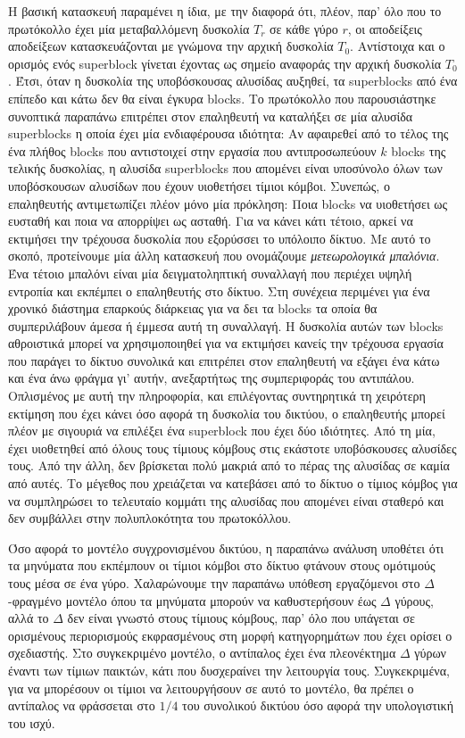 Η βασική κατασκευή παραμένει η ίδια, με την διαφορά ότι, πλέον, παρ' όλο που το πρωτόκολλο
έχει μία μεταβαλλόμενη δυσκολία $T_r$ σε κάθε γύρο $r$, οι αποδείξεις αποδείξεων κατασκευάζονται
με γνώμονα την αρχική δυσκολία $T_0$. Αντίστοιχα και ο ορισμός ενός superblock γίνεται έχοντας
ως σημείο αναφοράς την αρχική δυσκολία $T_0$. Έτσι, όταν η δυσκολία της υποβόσκουσας αλυσίδας
αυξηθεί, τα superblocks από ένα επίπεδο και κάτω δεν θα είναι έγκυρα blocks. Το πρωτόκολλο
που παρουσιάστηκε συνοπτικά παραπάνω επιτρέπει στον επαληθευτή να καταλήξει σε μία αλυσίδα
superblocks η οποία έχει μία ενδιαφέρουσα ιδιότητα: Αν αφαιρεθεί από το τέλος της ένα πλήθος
blocks που αντιστοιχεί στην εργασία που αντιπροσωπεύουν $k$ blocks της τελικής δυσκολίας, η
αλυσίδα superblocks που απομένει είναι υποσύνολο όλων των υποβόσκουσων αλυσίδων που έχουν
υιοθετήσει τίμιοι κόμβοι. Συνεπώς, ο επαληθευτής αντιμετωπίζει πλέον μόνο μία πρόκληση:
Ποια blocks να υιοθετήσει ως ευσταθή και ποια να απορρίψει ως ασταθή. Για να κάνει κάτι
τέτοιο, αρκεί να εκτιμήσει την τρέχουσα δυσκολία που εξορύσσει το υπόλοιπο δίκτυο. Με
αυτό το σκοπό, προτείνουμε μία άλλη κατασκευή που ονομάζουμε \emph{μετεωρολογικά μπαλόνια}.
Ένα τέτοιο μπαλόνι είναι μία δειγματοληπτική συναλλαγή που περιέχει υψηλή εντροπία και
εκπέμπει ο επαληθευτής στο δίκτυο. Στη συνέχεια περιμένει για ένα χρονικό διάστημα επαρκούς
διάρκειας για να δει τα blocks τα οποία θα συμπεριλάβουν άμεσα ή έμμεσα αυτή τη συναλλαγή.
Η δυσκολία αυτών των blocks αθροιστικά μπορεί να χρησιμοποιηθεί για να εκτιμήσει κανείς
την τρέχουσα εργασία που παράγει το δίκτυο συνολικά και επιτρέπει στον επαληθευτή να
εξάγει ένα κάτω και ένα άνω φράγμα γι' αυτήν, ανεξαρτήτως της συμπεριφοράς του αντιπάλου.
Οπλισμένος με αυτή την πληροφορία, και επιλέγοντας συντηρητικά τη χειρότερη εκτίμηση που
έχει κάνει όσο αφορά τη δυσκολία του δικτύου, ο επαληθευτής μπορεί πλέον με σιγουριά να
επιλέξει ένα superblock που έχει δύο ιδιότητες. Από τη μία, έχει υιοθετηθεί από όλους τους
τίμιους κόμβους στις εκάστοτε υποβόσκουσες αλυσίδες τους. Από την άλλη, δεν βρίσκεται πολύ
μακριά από το πέρας της αλυσίδας σε καμία από αυτές. Το μέγεθος που χρειάζεται να κατεβάσει
από το δίκτυο ο τίμιος κόμβος για να συμπληρώσει το τελευταίο κομμάτι της αλυσίδας που
απομένει είναι σταθερό και δεν συμβάλλει στην πολυπλοκότητα του πρωτοκόλλου.

Όσο αφορά το μοντέλο συγχρονισμένου δικτύου, η παραπάνω ανάλυση υποθέτει ότι τα μηνύματα που
εκπέμπουν οι τίμιοι κόμβοι στο δίκτυο φτάνουν στους ομότιμούς τους μέσα σε ένα γύρο.
Χαλαρώνουμε την παραπάνω υπόθεση εργαζόμενοι στο $\Delta$-φραγμένο μοντέλο όπου τα μηνύματα
μπορούν να καθυστερήσουν έως $\Delta$ γύρους, αλλά το $\Delta$ δεν είναι γνωστό στους τίμιους
κόμβους, παρ' όλο που υπάγεται σε ορισμένους περιορισμούς εκφρασμένους στη μορφή κατηγορημάτων
που έχει ορίσει ο σχεδιαστής. Στο συγκεκριμένο μοντέλο, ο αντίπαλος έχει ένα πλεονέκτημα $\Delta$
γύρων έναντι των τίμιων παικτών, κάτι που δυσχεραίνει την λειτουργία τους. Συγκεκριμένα, για να
μπορέσουν οι τίμιοι να λειτουργήσουν σε αυτό το μοντέλο, θα πρέπει ο αντίπαλος να φράσσεται
στο $1/4$ του συνολικού δικτύου όσο αφορά την υπολογιστική του ισχύ.

